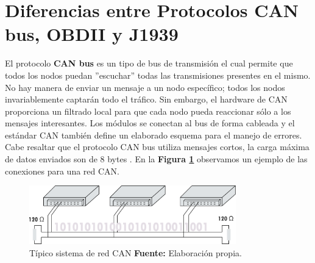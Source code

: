 









\section{Diferencias entre Protocolos CAN bus,  OBDII y J1939}
El protocolo {\bfseries CAN bus} es un tipo de bus de transmisión el cual permite que todos los nodos puedan ''escuchar'' todas las transmisiones presentes en el mismo. No hay manera de enviar un mensaje a un nodo específico; todos los nodos invariablemente captarán todo el tráfico. Sin embargo, el hardware de CAN proporciona un filtrado local para que cada nodo pueda reaccionar sólo a los mensajes interesantes. Los módulos se conectan al bus de forma cableada y el estándar CAN también define un elaborado esquema para el manejo de errores. Cabe resaltar que el protocolo CAN bus utiliza mensajes cortos, la carga máxima de datos enviados son de 8 bytes \cite{can_c3}. En la \textbf{Figura \ref{fig_can_c3}} observamos un ejemplo de las conexiones para una red CAN. 

\begin{figure}[H]
	\centering
	\includegraphics[width=0.8\textwidth]{./Cap3imagen/can.pdf}
	\caption [Típico sistema de red CAN.]{Típico sistema de red CAN\textbf{ Fuente:} %
		Elaboración propia.}
	\label{fig_can_c3} %
\end{figure}

